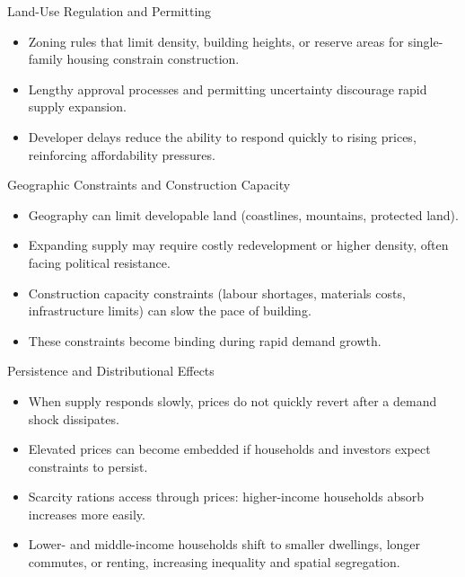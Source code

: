 \documentclass[aspectratio=169]{beamer}
\begin{document}
\begin{frame}{Land-Use Regulation and Permitting}
\transfade
\begin{itemize}[<+->]
  \item Zoning rules that limit density, building heights, or reserve areas for single-family housing constrain construction.
  \item Lengthy approval processes and permitting uncertainty discourage rapid supply expansion.
  \item Developer delays reduce the ability to respond quickly to rising prices, reinforcing affordability pressures.
\end{itemize}
\end{frame}

\begin{frame}{Geographic Constraints and Construction Capacity}
\transfade
\begin{itemize}[<+->]
  \item Geography can limit developable land (coastlines, mountains, protected land).
  \item Expanding supply may require costly redevelopment or higher density, often facing political resistance.
  \item Construction capacity constraints (labour shortages, materials costs, infrastructure limits) can slow the pace of building.
  \item These constraints become binding during rapid demand growth.
\end{itemize}
\end{frame}

\begin{frame}{Persistence and Distributional Effects}
\transfade
\begin{itemize}[<+->]
  \item When supply responds slowly, prices do not quickly revert after a demand shock dissipates.
  \item Elevated prices can become embedded if households and investors expect constraints to persist.
  \item Scarcity rations access through prices: higher-income households absorb increases more easily.
  \item Lower- and middle-income households shift to smaller dwellings, longer commutes, or renting, increasing inequality and spatial segregation.
\end{itemize}
\end{frame}
\end{document}
